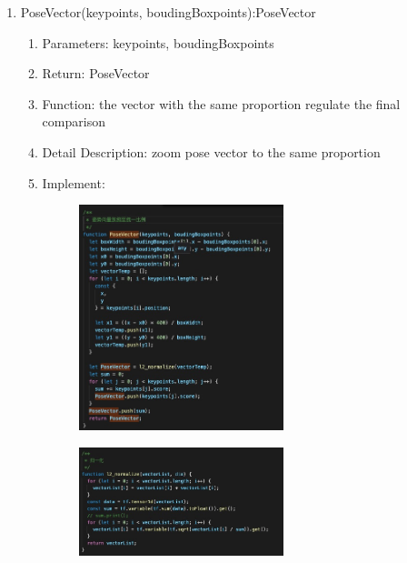 \documentclass[16pt]{scrreprt}
\begin{document}
\begin{enumerate}
    \item PoseVector(keypoints, boudingBoxpoints):PoseVector
        \begin{enumerate}
            \item Parameters: keypoints, boudingBoxpoints
            \item Return: PoseVector
            \item Function: the vector with the same proportion regulate the final comparison
            \item Detail Description: zoom pose vector to the same proportion
            \item Implement:
                \begin{figure}[H]
                    \centering
                    \includegraphics[width=0.6\textwidth]{diagrams/comparison-1.jpg}\\
                \end{figure}

                \begin{figure}[H]
                    \centering
                    \includegraphics[width=0.6\textwidth]{diagrams/comparison-2.jpg}\\
                \end{figure}
        \end{enumerate}


\end{enumerate}
\end{document}
